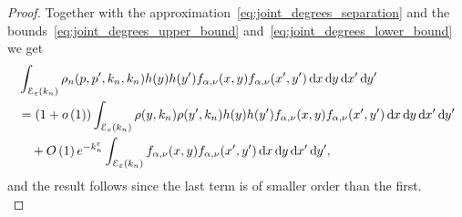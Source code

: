 \begin{proof}
Together with the approximation~\eqref{eq:joint_degrees_separation} and the bounds~\eqref{eq:joint_degrees_upper_bound} and~\eqref{eq:joint_degrees_lower_bound} we get
\begin{align*}
	&\int_{\mathcal{E}_{\varepsilon}(k_n)} \rho_{n}(p,p^\prime,k_n,k_n) h(y) h(y^\prime) f_{\alpha,\nu}(x,y)
		f_{\alpha,\nu}(x^\prime,y^\prime) \dd x \dd y \dd x^\prime \dd y^\prime\\
	&=(1 + \smallO{1}) \int_{\mathcal{E}_{\varepsilon}(k_n)} \rho(y,k_n) \rho(y^\prime,k_n) h(y)h(y^\prime) 
		f_{\alpha,\nu}(x,y)	f_{\alpha,\nu}(x^\prime,y^\prime) \dd x \dd y \dd x^\prime \dd y^\prime\\
	&\hspace{10pt} + \bigO{1} e^{-k_n^{\varepsilon}} \int_{\mathcal{E}_{\varepsilon}(k_n)}
		f_{\alpha,\nu}(x,y)	f_{\alpha,\nu}(x^\prime,y^\prime) \dd x \dd y \dd x^\prime \dd y^\prime,			
\end{align*}
and the result follows since the last term is of smaller order than the first.\\
\vspace{5pt}


\end{proof}
